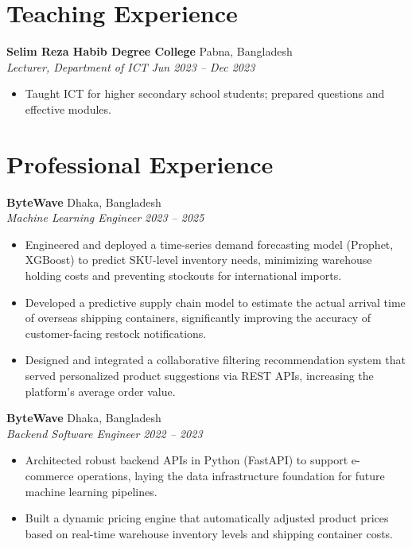 \documentclass[a4paper,10pt]{article}
\newcommand{\entry}[4]{%
  \noindent\textbf{#1} \hfill #2\\
  \textit{#3} \hfill \textit{#4}\par\vspace{2pt}
}
\begin{document}
\section{Teaching Experience}
\entry{Selim Reza Habib Degree College}{Pabna, Bangladesh}{Lecturer, Department of ICT}{Jun 2023 -- Dec 2023}
\begin{itemize}
  \item Taught ICT for higher secondary school students; prepared questions and effective modules.
\end{itemize}

\section{Professional Experience}
\entry{ByteWave}{Dhaka, Bangladesh}{Machine Learning Engineer}{2023 -- 2025}
\begin{itemize}
  \item Engineered and deployed a time-series demand forecasting model (Prophet, XGBoost) to predict SKU-level inventory needs, minimizing warehouse holding costs and preventing stockouts for international imports.
  \item Developed a predictive supply chain model to estimate the actual arrival time of overseas shipping containers, significantly improving the accuracy of customer-facing restock notifications.
  \item Designed and integrated a collaborative filtering recommendation system that served personalized product suggestions via REST APIs, increasing the platform's average order value.
\end{itemize}

\entry{ByteWave}{Dhaka, Bangladesh}{Backend Software Engineer}{2022 -- 2023}
\begin{itemize}
  \item Architected robust backend APIs in Python (FastAPI) to support e-commerce operations, laying the data infrastructure foundation for future machine learning pipelines.
  \item Built a dynamic pricing engine that automatically adjusted product prices based on real-time warehouse inventory levels and shipping container costs.
\end{itemize}
\end{document}
